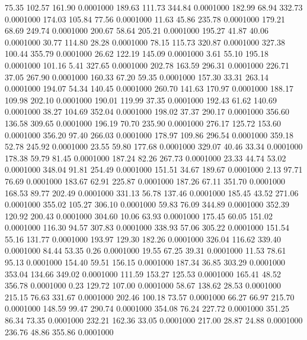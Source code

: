   75.35  102.57  161.90   0.0001000
 189.63  111.73  344.84   0.0001000
 182.99   68.94  332.73   0.0001000
 174.03  105.84   77.56   0.0001000
  11.63   45.86  235.78   0.0001000
 179.21   68.69  249.74   0.0001000
 200.67   58.64  205.21   0.0001000
 195.27   41.87   40.06   0.0001000
  30.77  114.80   28.28   0.0001000
  78.15  115.73  320.87   0.0001000
 327.38  100.44  355.79   0.0001000
  26.62  122.19  145.09   0.0001000
   3.61   55.10  195.18   0.0001000
 101.16    5.41  327.65   0.0001000
 202.78  163.59  296.31   0.0001000
 226.71   37.05  267.90   0.0001000
 160.33   67.20   59.35   0.0001000
 157.30   33.31  263.14   0.0001000
 194.07   54.34  140.45   0.0001000
 260.70  141.63  170.97   0.0001000
 188.17  109.98  202.10   0.0001000
 190.01  119.99   37.35   0.0001000
 192.43   61.62  140.69   0.0001000
  38.27  104.69  352.04   0.0001000
 198.02   37.37  290.17   0.0001000
 356.60  136.58  309.65   0.0001000
 196.19   70.70  235.90   0.0001000
 276.17  125.72  153.60   0.0001000
 356.20   97.40  266.03   0.0001000
 178.97  109.86  296.54   0.0001000
 359.18   52.78  245.92   0.0001000
  23.55   59.80  177.68   0.0001000
 329.07   40.46   33.34   0.0001000
 178.38   59.79   81.45   0.0001000
 187.24   82.26  267.73   0.0001000
  23.33   44.74   53.02   0.0001000
 348.04   91.81  254.49   0.0001000
 151.51   34.67  189.67   0.0001000
   2.13   97.71   76.69   0.0001000
 183.67   62.91  225.87   0.0001000
 187.26   67.11  351.70   0.0001000
 168.53   89.77  202.49   0.0001000
 331.13   56.78  137.46   0.0001000
 185.45   43.52  271.06   0.0001000
 355.02  105.27  306.10   0.0001000
  59.83   76.09  344.89   0.0001000
 352.39  120.92  200.43   0.0001000
 304.60   10.06   63.93   0.0001000
 175.45   60.05  151.02   0.0001000
 116.30   94.57  307.83   0.0001000
 338.93   57.06  305.22   0.0001000
 151.54   55.16  131.77   0.0001000
 193.97  129.30  182.26   0.0001000
 326.04  116.62  339.40   0.0001000
  84.44   53.35    0.26   0.0001000
  19.55   67.25   39.31   0.0001000
  11.53   78.61   95.13   0.0001000
 154.40   59.51  156.15   0.0001000
 187.34   36.85  303.29   0.0001000
 353.04  134.66  349.02   0.0001000
 111.59  153.27  125.53   0.0001000
 165.41   48.52  356.78   0.0001000
   0.23  129.72  107.00   0.0001000
  58.67  138.62   28.53   0.0001000
 215.15   76.63  331.67   0.0001000
 202.46  100.18   73.57   0.0001000
  66.27   66.97  215.70   0.0001000
 148.59   99.47  290.74   0.0001000
 354.08   76.24  227.72   0.0001000
 351.25   86.34   73.35   0.0001000
 232.21  162.36   33.05   0.0001000
 217.00   28.87   24.88   0.0001000
 236.76   48.86  355.86   0.0001000
